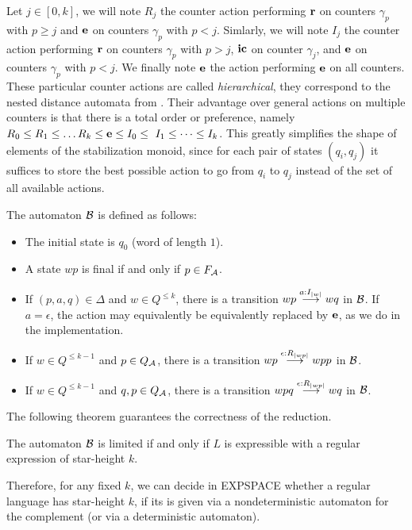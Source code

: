 Let $j\in[0,k]$, we will note $R_j$ the counter action performing $\mathbf{r}$ on counters $\gamma_p$ with $p\geq j$ and $\mathbf{e}$ on counters $\gamma_p$ with $p<j$. Simlarly, we will note $I_j$ the counter action performing $\mathbf{r}$ on counters $\gamma_p$ with $p> j$, $\mathbf{ic}$ on counter $\gamma_j$, and $\mathbf{e}$ on counters $\gamma_p$ with $p<j$. We finally note $\mathbf{e}$ the action performing $\mathbf{e}$ on all counters.
These particular counter actions are called \emph{hierarchical}, they correspond to the nested distance automata from \cite{Kirsten05}. Their advantage over general actions on multiple counters is that there is a total order or preference, namely $R_0\leq R_1\leq\dots R_k\leq \e\leq I_0\leq\ I_1\leq\dots\leq I_k$. This greatly simplifies the shape of elements of the stabilization monoid, since for each pair of states $(q_i,q_j)$ it suffices to store the best possible action to go from $q_i$ to $q_j$ instead of the set of all available actions.

The automaton $\mathcal B$ is defined as follows:

\begin{itemize}
\item The initial state is $q_0$ (word of length $1$).
\item A state $wp$ is final if and only if $p\in F_{\mathcal{A}}$.
\item If $(p,a,q)\in\Delta$ and $w\in Q^{\leq k}$, there is a transition $wp\stackrel{a:I_{|w|}}{\longrightarrow}wq$ in $\mathcal B$. If $a=\epsilon$, the action may equivalently be equivalently replaced by $\mathbf{e}$, as we do in the implementation.
\item If $w\in Q^{\leq k-1}$ and $p\in Q_{\mathcal{A}}$, there is a transition $wp\stackrel{\epsilon:R_{|wp|}}{\longrightarrow}wpp$ in $\mathcal B$.
\item If $w\in Q^{\leq k-1}$ and $q,p\in Q_{\mathcal{A}}$, there is a transition $wpq\stackrel{\epsilon:R_{|wp|}}{\longrightarrow}wq$ in $\mathcal B$.
\end{itemize}


The following theorem guarantees the correctness of the reduction.
\begin{theorem}\cite{CL08sh}
The automaton $\mathcal B$ is limited if and only if $L$ is expressible with a regular expression of star-height $k$.
\end{theorem}

Therefore, for any fixed $k$, we can decide in EXPSPACE whether a regular language has star-height $k$, if its is given via a nondeterministic automaton for the complement (or via a deterministic automaton).

